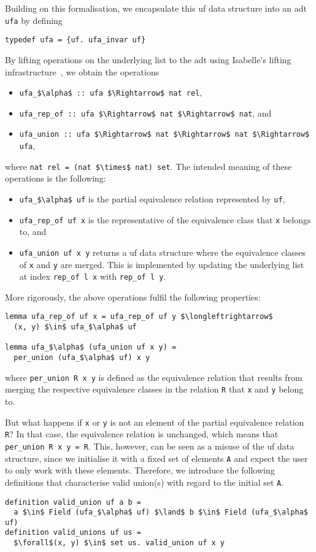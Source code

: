 \documentclass[
  sigplan,
  10pt,
  anonymous,
  review,
  ]{acmart}
\begin{document}
Building on this formalisation, we encapsulate this \acrshort{uf} data structure into an \acrfull{adt} \lstinline|ufa| by defining
\begin{lstlisting}
typedef ufa = {uf. ufa_invar uf}
\end{lstlisting}
By lifting operations on the underlying list to the \acrshort{adt} using Isabelle's lifting infrastructure~\cite{lifting_transfer}, we obtain the operations
\begin{itemize}
  \item \lstinline!ufa_$\alpha$ :: ufa $\Rightarrow$ nat rel!,
  \item \lstinline!ufa_rep_of :: ufa $\Rightarrow$ nat $\Rightarrow$ nat!, and
  \item \lstinline!ufa_union :: ufa $\Rightarrow$ nat $\Rightarrow$ nat $\Rightarrow$ ufa!,
\end{itemize}
where \lstinline!nat rel = (nat $\times$ nat) set!.
The intended meaning of these operations is the following:
\begin{itemize}
  \item \lstinline!ufa_$\alpha$ uf! is the partial equivalence relation represented by \lstinline!uf!,
  \item \lstinline!ufa_rep_of uf x! is the representative of the equivalence class that \lstinline!x! belongs to, and
  \item \lstinline!ufa_union uf x y! returns a \acrshort{uf} data structure where the equivalence classes of \lstinline!x! and \lstinline!y! are merged.
    This is implemented by updating the underlying list at index \lstinline!rep_of l x! with \lstinline|rep_of l y|.
\end{itemize}
More rigorously, the above operations fulfil the following properties:
\begin{lstlisting}
lemma ufa_rep_of uf x = ufa_rep_of uf y $\longleftrightarrow$
  (x, y) $\in$ ufa_$\alpha$ uf

lemma ufa_$\alpha$ (ufa_union uf x y) =
  per_union (ufa_$\alpha$ uf) x y
\end{lstlisting}
where \lstinline!per_union R x y! is defined as the equivalence relation that results from merging the respective equivalence classes in the relation \lstinline|R| that \lstinline!x! and \lstinline!y! belong to.

But what happens if \lstinline!x! or \lstinline!y! is not an element of the partial equivalence relation \lstinline|R|?
In that case, the equivalence relation is unchanged, which means that \lstinline|per_union R x y = R|.
This, however, can be seen as a misuse of the \acrshort{uf} data structure, since we initialise it with a fixed set of elements \lstinline|A| and expect the user to only work with these elements.
Therefore, we introduce the following definitions that characterise valid union(s) with regard to the initial set \lstinline|A|.
\begin{lstlisting}
definition valid_union uf a b =
  a $\in$ Field (ufa_$\alpha$ uf) $\land$ b $\in$ Field (ufa_$\alpha$ uf)
definition valid_unions uf us =
  $\forall$(x, y) $\in$ set us. valid_union uf x y
\end{lstlisting}
\end{document}
